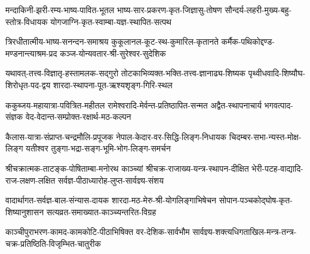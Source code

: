 \twolineshloka
{मन्दाकिनी-झरी-रम्य-भाष्य-पावित-भूतल}
{भाष्य-सार-प्रकरण-कृत-जिज्ञासु-तोषण}
\twolineshloka
{सौन्दर्य-लहरी-मुख्य-बहु-स्तोत्र-विधायक}
{योगजाग्नि-कृत-स्वाम्बा-यज्ञ-स्थापित-सत्पथ}
\jayavijayibhava

\twolineshloka
{त्रिरधीतात्मीय-भाष्य-सनन्दन-समाश्रय}
{कुकूलानल-कूट-स्थ-कुमारिल-कृतानते}
\twolineshloka
{कर्मैक-पथिकोद्दण्ड-मण्डनान्त्याश्रम-प्रद}
{कञ्ज-योन्यवतार-श्री-सुरेश्वर-सुदेशिक}
\jayavijayibhava

\twolineshloka
{यथावत्-तत्त्व-विज्ञातृ-हस्तामलक-सद्गुरो}
{तोटकाभिव्यक्त-भक्ति-तत्त्व-ज्ञानाढ्य-शिष्यक}
\twolineshloka
{पृथ्वीधवादि-शिष्यौघ-शिरोधृत-पद-द्वय}
{शारदा-स्थापना-पूत-ऋश्यशृङ्ग-गिरि-स्थल}
\jayavijayibhava

\twolineshloka
{ककुब्जय-महायात्रा-पवित्रित-महीतल}
{रामेश्वरादि-मेर्वन्त-प्रतिष्ठापित-सन्मत}
\twolineshloka
{अद्वैत-स्थापनाचार्य भगवत्पाद-संज्ञक}
{वेद-वेदान्त-सम्प्रोक्त-रक्षार्थ-मठ-कल्पन}
\jayavijayibhava

\twolineshloka
{कैलास-यात्रा-संप्राप्त-चन्द्रमौलि-प्रपूजक}
{नेपाल-केदार-वर-सिद्धि-लिङ्ग-निधायक}
\twolineshloka
{चिदम्बर-सभा-न्यस्त-मोक्ष-लिङ्ग यतीश्वर}
{तुङ्गा-भद्रा-सङ्ग-भूमि-भोग-लिङ्ग-समर्चन}
\jayavijayibhava

\twolineshloka
{श्रीचक्रात्मक-ताटङ्क-पोषिताम्बा-मनोरथ}
{काञ्च्यां श्रीचक्र-राजाख्य-यन्त्र-स्थापन-दीक्षित}
\twolineshloka
{भेरी-पटह-वाद्यादि-राज-लक्षण-लक्षित}
{सर्वज्ञ-पीठाध्यारोह-लुप्त-सार्वज्ञ्य-संशय}
\jayavijayibhava

\twolineshloka
{वादार्थागत-सर्वज्ञ-बाल-संन्यास-दायक}
{शारदा-मठ-मेरु-श्री-योगलिङ्गाभिषेचन}
\twolineshloka
{सोपान-पञ्चकोद्घोष-कृत-शिष्यानुशासन}
{सत्यव्रत-समाख्यात-काञ्च्यन्तरित-विग्रह}
\jayavijayibhava

\twolineshloka
{काञ्चीपुराभरण-कामद-कामकोटि-पीठाभिषिक्त वर-देशिक-सार्वभौम}
{सार्वज्ञ्य-शक्त्यधिगताखिल-मन्त्र-तन्त्र-चक्र-प्रतिष्ठिति-विजृम्भित-चातुरीक}
\jayavijayibhava


\closesection


\centering

\vfill
{}

